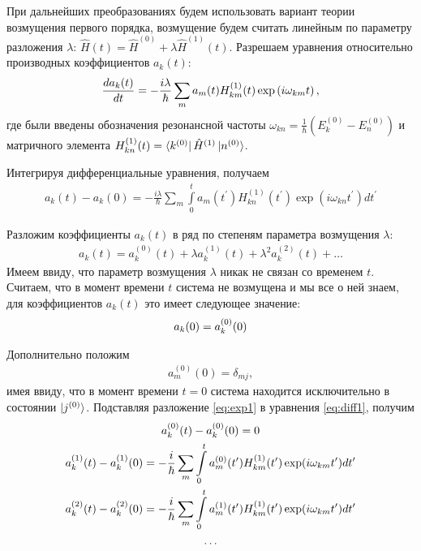 \documentclass[12pt]{article}
\newcommand{\lb}{\left(}
\newcommand{\rb}{\right)}
\begin{document}
При дальнейших преобразованиях будем использовать вариант теории возмущения первого порядка, возмущение будем считать линейным по параметру разложения $\lambda$: $\hat{H}(t) = \hat{H}^{(0)} + \lambda \hat{H}^{(1)}(t)$. Разрешаем уравнения относительно производных коэффициентов $a_k(t)$:
\begin{gather}
	\frac{d a_k(t)}{dt} = - \frac{i \lambda}{\hbar} \sum_m a_m(t) H_{km}^{(1)}(t) \exp \lb i \omega_{km} t \rb , \notag
\end{gather}
где были введены обозначения резонансной частоты $\omega_{kn} = \displaystyle \frac{1}{\hbar} \lb E_k^{(0)} - E_n^{(0)} \rb$ и матричного элемента $H_{kn}^{(1)}(t) = \bra{k^{(0)}} \hat{H}^{(1)} \ket{n^{(0)}}$.

Интегрируя дифференциальные уравнения, получаем
\begin{gather}
	a_k(t) - a_k(0) = - \frac{i \lambda}{\hbar} \sum_m \int\limits_0^t a_m(t^\prime) H_{kn}^{(1)} (t^\prime) \exp \lb i \omega_{kn} t^\prime \rb d t^\prime \label{eq:diff1}
\end{gather}

Разложим коэффициенты $a_k(t)$ в ряд по степеням параметра возмущения $\lambda$:
\begin{gather}
	a_k(t) = a_k^{(0)}(t) + \lambda a_k^{(1)}(t) + \lambda^2 a_k^{(2)}(t) + \dots \label{eq:exp1}
\end{gather}
Имеем ввиду, что параметр возмущения $\lambda$ никак не связан со временем $t$. Считаем, что в момент времени $t$ система не возмущена и мы все о ней знаем, для коэффициентов $a_k(t)$ это имеет следующее значение:
\begin{gather}
	a_k(0) = a_k^{(0)}(0) \notag 
\end{gather}


Дополнительно положим 
\begin{gather}
	a_m^{(0)}(0) = \delta_{mj}, \label{eq:exp2}
\end{gather}
имея ввиду, что в момент времени $t = 0$ система находится исключительно в состоянии $\ket{j^{(0)}}$. Подставляя разложение \eqref{eq:exp1} в уравнения \eqref{eq:diff1}, получим
\begin{gather}
	a_k^{(0)}(t) - a_k^{(0)}(0) = 0 \notag \\
	a_k^{(1)}(t) - a_k^{(1)}(0) = - \frac{i}{\hbar} \sum_m \int\limits_0^t a_m^{(0)}(t^\prime) H_{km}^{(1)} (t^\prime) \exp (i \omega_{km} t^\prime) dt^\prime \notag \\
	a_k^{(2)}(t) - a_k^{(2)}(0) = - \frac{i}{\hbar} \sum_m \int\limits_0^t a_m^{(1)} (t^\prime) H_{km}^{(1)} (t^\prime) \exp (i \omega_{km} t^\prime) d t^\prime \notag \\
 \dots \notag 
\end{gather}
\end{document}
